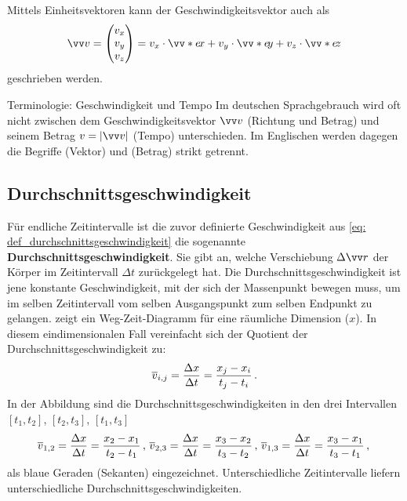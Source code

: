 Mittels Einheitsvektoren kann der Geschwindigkeitsvektor auch als
\begin{equation}
    \ivec{v} = \icolThree{v_x}{v_y}{v_z} = v_{x}\cdot\ivecS{e}{x} + v_{y} \cdot \ivecS{e}{y} + v_{z} \cdot \ivecS{e}{z}
\end{equation}
geschrieben werden.

\begin{rememberbox}{Terminologie: Geschwindigkeit und Tempo}
    Im deutschen Sprachgebrauch wird oft nicht zwischen dem Geschwindigkeitsvektor $\ivec{v}$ (Richtung und Betrag) und seinem Betrag $v=|\ivec{v}|$ (Tempo) unterschieden. Im Englischen werden dagegen die Begriffe  (Vektor) und  (Betrag) strikt getrennt.
\end{rememberbox}

\subsection{Durchschnittsgeschwindigkeit}\label{subsec: durchschnittsgeschwindigkeit}
Für endliche Zeitintervalle ist die zuvor definierte Geschwindigkeit aus \cref{eq: def_durchschnittsgeschwindigkeit} die sogenannte \textbf{Durchschnittsgeschwindigkeit}. Sie gibt an, welche Verschiebung $\Delta\ivec{r}$ der Körper im Zeitintervall $\Delta t$ zurückgelegt hat. Die Durchschnittsgeschwindigkeit ist jene konstante Geschwindigkeit, mit der sich der Massenpunkt bewegen muss, um im selben Zeitintervall vom selben Ausgangspunkt zum selben Endpunkt zu gelangen.
 zeigt ein Weg-Zeit-Diagramm für eine räumliche Dimension ($x$). In diesem eindimensionalen Fall vereinfacht sich der Quotient der Durchschnittsgeschwindigkeit zu:
\begin{equation}
    \overline{v}_{i,j}=\frac{\Delta x}{\Delta t}=\frac{x_{j}-x_{i}}{t_{j}-t_{i}}\,.
\end{equation}
In der Abbildung sind die Durchschnittsgeschwindigkeiten in den drei Intervallen $[t_1, t_2]$, $[t_2, t_3]$, $[t_1, t_3]$
\begin{equation*}
    \overline{v}_{1,2}=\frac{\Delta x}{\Delta t}=\frac{x_{2}-x_{1}}{t_{2}-t_{1}} \,{,}\,\,\overline{v}_{2,3}=\frac{\Delta x}{\Delta t}=\frac{x_{3}-x_{2}}{t_{3}-t_{2}} \,{,}\,\,  \overline{v}_{1,3}=\frac{\Delta x}{\Delta t}=\frac{x_{3}-x_{1}}{t_{3}-t_{1}} \,{,}\, 
\end{equation*}
als blaue Geraden (Sekanten) eingezeichnet. Unterschiedliche Zeitintervalle liefern unterschiedliche Durchschnittsgeschwindigkeiten.

